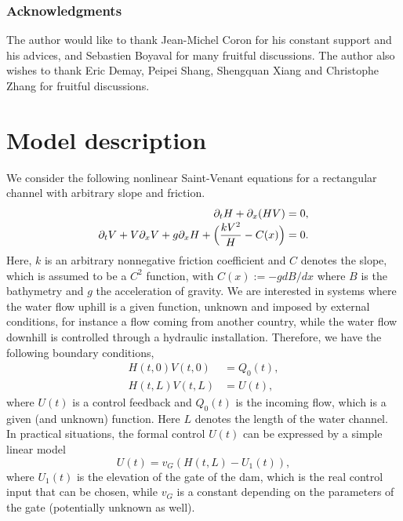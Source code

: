 \documentclass[11pt]{article}
\numberwithin{equation}{section}
\theoremstyle{definition}
\begin{document}
\subsubsection*{Acknowledgments}
The author would like to thank Jean-Michel Coron for his constant support and his advices, and Sebastien Boyaval for many fruitful discussions.
The author also wishes to thank Eric Demay, Peipei Shang, Shengquan Xiang and Christophe Zhang for fruitful discussions.

\section{Model description}
\label{s1}
We
consider
the following nonlinear Saint-Venant equations for a rectangular channel with arbitrary slope and friction.\vspace*{-3pt}
\begin{equation}
\begin{split}
\partial_{t}H+\partial_{x}(HV)&=0,\\[-3pt]
\partial_{t}V+V\partial_{x}V+g\partial_{x}H+\Bigl(\frac{kV^{2}}{H}-C(x)\Bigr)&=0.
\end{split}
\label{Stvenant}
\end{equation}
Here, $k$ is an arbitrary nonnegative friction coefficient and $C$ denotes the slope, which is assumed to be a $C^{2}$ function, with $C(x):=-gdB/dx$ where $B$ is the bathymetry and $g$ the acceleration of gravity.
We are interested in systems where the water flow uphill is a given function, unknown and imposed by external conditions, for instance a flow coming from another country, while the water flow downhill is controlled through a hydraulic installation. Therefore, we have the following boundary conditions,
\begin{equation}
\begin{split}
H(t,0)V(t,0)&=Q_{0}(t),\\
H(t,L)V(t,L)&=U(t),
\end{split}
\label{boundary02}
\end{equation}
where $U(t)$
is a control feedback and $Q_{0}(t)$
is the incoming flow, which is a given (and unknown) function. Here $L$ denotes the length of the water channel.
In practical situations, the formal control $U(t)$ can be expressed by a simple linear model \cite{BastinCoronPI}
\begin{equation}
U(t)=v_{G}(H(t,L)-U_{1}(t)),
\label{vG}
\end{equation}
where $U_{1}(t)$ is the elevation of the gate of the dam, which is the real control input that can be chosen, while $v_{G}$ is a constant depending on the parameters of the gate (potentially unknown as well).
\end{document}
